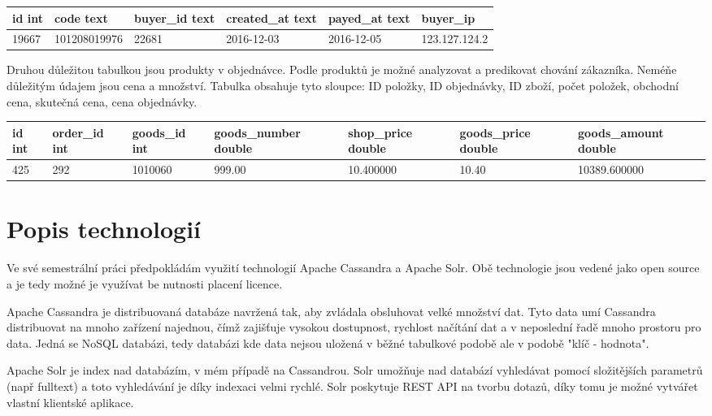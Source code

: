 \documentclass[czech]{article}
\begin{document}
\begin{table}[h!]
\begin{tabular}{|l|l|l|l|l|l|}
\hline
id int & code text    & buyer\_id text & created\_at text & payed\_at text & buyer\_ip     \\
\hline
19667  & 101208019976 & 22681          & 2016-12-03       & 2016-12-05     & 123.127.124.2 \\
\hline

\end{tabular}
\end{table}

Druhou důležitou tabulkou jsou produkty v objednávce. Podle produktů je možné analyzovat a predikovat chování zákazníka. Neméňe důležitým údajem jsou cena a množství. Tabulka obsahuje tyto sloupce: ID položky, ID objednávky, ID zboží, počet položek, obchodní cena, skutečná cena, cena objednávky.

\begin{table}[h!]
\begin{tabular}{|l|l|l|l|l|l|l|}
\hline
id int & order\_id int & goods\_id int & goods\_number double & shop\_price double & goods\_price double & goods\_amount double \\ \hline
425    & 292           & 1010060       & 999.00               & 10.400000          & 10.40               & 10389.600000         \\ \hline
\end{tabular}
\end{table}

\section{Popis technologií}

Ve své semestrální práci předpokládám využití technologií Apache Cassandra a Apache Solr. Obě technologie jsou vedené jako open source a je tedy možné je využívat be nutnosti placení licence.

Apache Cassandra je distribuovaná databáze navržená tak, aby zvládala obsluhovat velké množství dat. Tyto data umí Cassandra distribuovat na mnoho zařízení najednou, čímž zajišťuje vysokou dostupnost, rychlost načítání dat a v neposlední řadě mnoho prostoru pro data. Jedná se NoSQL databázi, tedy databázi kde data nejsou uložená v běžné tabulkové podobě ale v podobě "klíč - hodnota".

Apache Solr je index nad databázím, v mém případě na Cassandrou. Solr umožňuje nad databází vyhledávat pomocí složitějších parametrů (např fulltext) a toto vyhledávání je díky indexaci velmi rychlé. Solr poskytuje REST API na tvorbu dotazů, díky tomu je možné vytvářet vlastní klientské aplikace.
\end{document}
